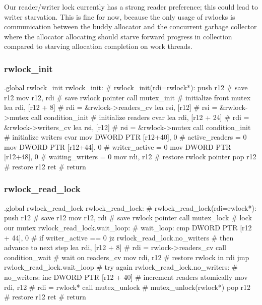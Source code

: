 Our reader/writer lock currently has a strong reader preference; this could
lead to writer starvation. This is fine for now, because the only usage of
rwlocks is communication between the buddy allocator and the concurrent garbage
collector where the allocator allocating should starve forward progress in
collection compared to starving allocation completion on work threads.

\subsubsection{rwlock\_init}

\begin{asm}
.global rwlock_init
rwlock_init:				    # rwlock_init(rdi=rwlock*):
	push	r12			    #   save r12
	mov	r12, rdi		    #   save rwlock pointer
	call	mutex_init		    #   initialize front mutex
	lea	rdi, [r12 + 8]		    #   rdi = &rwlock->readers_cv
	lea	rsi, [r12]		    #   rsi = &rwlock->mutex
	call	condition_init		    #   initialize readers cvar
	lea	rdi, [r12 + 24]		    #   rdi = &rwlock->writers_cv
	lea	rsi, [r12]		    #   rsi = &rwlock->mutex
	call	condition_init		    #   initialize writers cvar
	mov	DWORD PTR [r12+40], 0	    #   active_readers = 0
	mov	DWORD PTR [r12+44], 0       #   writer_active = 0
	mov	DWORD PTR [r12+48], 0	    #   waiting_writers = 0
	mov	rdi, r12		    #   restore rwlock pointer
	pop	r12			    #   restore r12
	ret				    #   return
\end{asm}

\subsubsection{rwlock\_read\_lock}

\begin{asm}
.global rwlock_read_lock
rwlock_read_lock:			    # rwlock_read_lock(rdi=rwlock*):
	push	r12			    #   save r12
	mov	r12, rdi		    #   save rwlock pointer
	call	mutex_lock		    #   lock our mutex
rwlock_read_lock.wait_loop:		    # wait_loop:
	cmp	DWORD PTR [r12 + 44], 0     #   if writer_active == 0
	jz	rwlock_read_lock.no_writers #   then advance to next step
	lea	rdi, [r12 + 8]		    #   rdi = rwlock->readers_cv
	call	condition_wait		    #   wait on readers_cv
	mov	rdi, r12		    #   restore rwlock in rdi
	jmp	rwlock_read_lock.wait_loop  #   try again
rwlock_read_lock.no_writers:		    # no_writers:
	inc	DWORD PTR [r12 + 40]	    #   increment readers atomically
	mov	rdi, r12		    #   rdi = rwlock*
	call	mutex_unlock		    #   mutex_unlock(rwlock*)
	pop	r12			    #   restore r12
	ret				    #   return
\end{asm}

